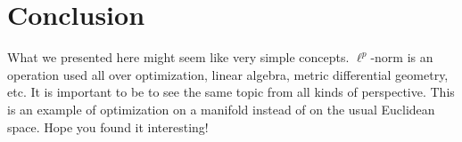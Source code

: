 \documentclass[11pt]{article}
\begin{document}
\section{Conclusion}
	What we presented here might seem like very simple concepts. $\ell^{p}$-norm is an operation used all over optimization, 
	linear algebra, metric differential geometry, etc. It is important to be to see the same topic from all kinds of perspective.
	This is an example of optimization on a manifold instead of on the usual Euclidean space. Hope you found it interesting! 
\end{document}
